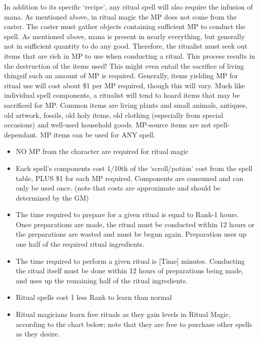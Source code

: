 \documentclass[twoside]{book}
\begin{document}
    {  
      In addition to its specific `recipe',
               any ritual spell will also require the infusion of mana.
               As mentioned above, in ritual magic the MP does not come
               from the caster. The caster must gather objects containing
               sufficient MP to conduct the spell. As mentioned above,
               mana is present in nearly everything, but generally not in
               sufficient quantity to do any good. Therefore, the
               ritualist must seek out items that are rich in MP to use
               when conducting a ritual. This process results in the
               destruction of the items used! This might even entail the
               sacrifice of living thingsif such an amount of MP
               is required. Generally, items yielding MP for ritual use
               will cost about \$1 per MP required, though this will vary.
               Much like individual spell components, a ritualist will
               tend to hoard items that may be sacrificed for MP. Common
               items are living plants and small animals, antiques, old
               artwork, fossils, old holy items, old clothing (especially
               from special occasions) and well-used household goods.
               MP-source items are not spell-dependant. MP items can be
               used for ANY spell. 
    }
  
\begin{itemize}
      
  \item   NO MP from the character are required for ritual
                 magic 
  \item   Each spell's components cost 1/10th of the
                 `scroll/potion' cost from the spell table,
                 PLUS \$1 for each MP required. Components are consumed
                 and can only be used once. (note that costs are
                 approximate and should be determined by the GM) 
  \item   The time required to prepare for a given ritual
                 is equal to Rank-1 hours. Once preparations are made,
                 the ritual must be conducted within 12 hours or the
                 preparations are wasted and must be begun again.
                 Preparation uses up one half of the required ritual
                 ingredients. 
  \item   The time required to perform a given ritual is
                 [Time] minutes. Conducting the ritual itself must be
                 done within 12 hours of preparations being made, and
                 uses up the remaining half of the ritual ingredients.
                 
  \item   Ritual spells cost 1 less Rank to learn than
                 normal 
  \item   Ritual magicians learn free rituals as they gain
                 levels in Ritual Magic, according to the chart below;
                 note that they are free to purchase other spells as they
                 desire. 
\end{itemize}
  
\end{document}
